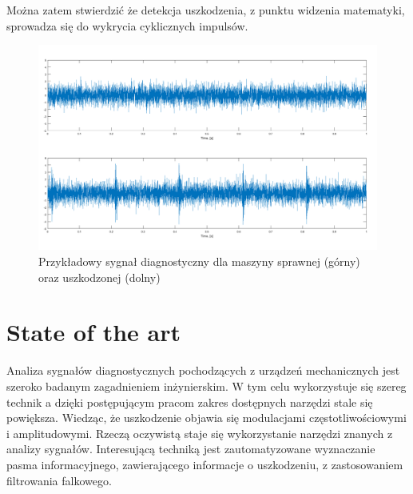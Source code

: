 \documentclass[inzynierska]{pwr_wmat_praca_dyplomowa}
\theoremstyle{plain}
\numberwithin{theorem}{chapter}
\theoremstyle{definition}
\numberwithin{theorem}{chapter}
\begin{document}
Można zatem stwierdzić że detekcja uszkodzenia, z punktu widzenia matematyki, sprowadza się do wykrycia cyklicznych impulsów. 
\begin{figure}[ht]
	\centering
	\includegraphics[scale=0.35]{images/zdrowy_pulsacja.png}
	\caption{Przykładowy sygnał diagnostyczny dla maszyny sprawnej (górny) oraz uszkodzonej (dolny)}
	\label{sygnal}
\end{figure}



\section{State of the art}
Analiza sygnałów diagnostycznych pochodzących z urządzeń mechanicznych jest szeroko badanym zagadnieniem inżynierskim. W tym celu wykorzystuje się szereg technik a dzięki postępującym pracom zakres dostępnych narzędzi stale się powiększa. Wiedząc, że uszkodzenie objawia się modulacjami częstotliwościowymi i amplitudowymi. Rzeczą oczywistą staje się wykorzystanie narzędzi znanych z analizy sygnałów.
Interesującą techniką jest zautomatyzowane wyznaczanie pasma informacyjnego, zawierającego informacje o uszkodzeniu, z zastosowaniem filtrowania falkowego\cite{linandzuo}. 
\end{document}
